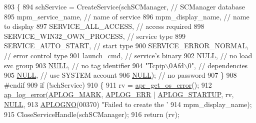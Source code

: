 \begin{DoxyCode}
{{{893         \{
894             schService = CreateService(schSCManager,     \textcolor{comment}{// SCManager database}
895                                  mpm\_service\_name,     \textcolor{comment}{// name of service}
896                                  mpm\_display\_name,     \textcolor{comment}{// name to display}
897                                  SERVICE\_ALL\_ACCESS,   \textcolor{comment}{// access required}
898                                  SERVICE\_WIN32\_OWN\_PROCESS,  \textcolor{comment}{// service type}
899                                  SERVICE\_AUTO\_START,   \textcolor{comment}{// start type}
900                                  SERVICE\_ERROR\_NORMAL, \textcolor{comment}{// error control type}
901                                  launch\_cmd,           \textcolor{comment}{// service's binary}
902                                  \hyperlink{pcre_8txt_ad7f989d16aa8ca809a36bc392c07fba1}{NULL},                 \textcolor{comment}{// no load svc group}
903                                  \hyperlink{pcre_8txt_ad7f989d16aa8ca809a36bc392c07fba1}{NULL},                 \textcolor{comment}{// no tag identifier}
904                                  \textcolor{stringliteral}{"Tcpip\(\backslash\)0Afd\(\backslash\)0"},       \textcolor{comment}{// dependencies}
905                                  \hyperlink{pcre_8txt_ad7f989d16aa8ca809a36bc392c07fba1}{NULL},                 \textcolor{comment}{// use SYSTEM account}
906                                  \hyperlink{pcre_8txt_ad7f989d16aa8ca809a36bc392c07fba1}{NULL});                \textcolor{comment}{// no password}
907         \}
908 \textcolor{preprocessor}{#endif}
909         \textcolor{keywordflow}{if} (!schService)
910         \{
911             rv = \hyperlink{group__apr__errno_gaa76e122da00af0ce2e8c8d7ff538bdfa}{apr\_get\_os\_error}();
912             \hyperlink{group__APACHE__CORE__LOG_ga5e6676c87418af7a1d323a116c78ecb4}{ap\_log\_error}(\hyperlink{group__APACHE__CORE__LOG_ga655e126996849bcb82e4e5a14c616f4a}{APLOG\_MARK}, \hyperlink{group__APACHE__CORE__LOG_ga57ad94ed8c92c4306de90479251a5d58}{APLOG\_ERR} | 
      \hyperlink{group__APACHE__CORE__LOG_ga39efd19b052fb6f39d8f263c16cc82b7}{APLOG\_STARTUP}, rv, \hyperlink{pcre_8txt_ad7f989d16aa8ca809a36bc392c07fba1}{NULL},
913                          \hyperlink{group__APACHE__CORE__LOG_ga1dee8a07e06bc5b3de8b89662c2cd666}{APLOGNO}(00370) \textcolor{stringliteral}{"Failed to create the '%
914                          mpm\_display\_name);
915             CloseServiceHandle(schSCManager);
916             \textcolor{keywordflow}{return} (rv);
}}}}
\end{DoxyCode}
